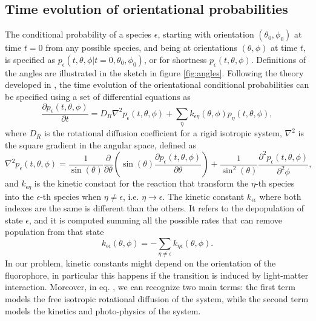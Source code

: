 \documentclass{article}
\begin{document}
\subsection{Time evolution of orientational probabilities}
The conditional probability of a species $\epsilon$, starting with orientation $(\theta_0, \phi_0)$ at time $t=0$ from any possible species, and being at orientations $(\theta, \phi)$ at time $t$, is specified as $p_\epsilon(t,\theta,\phi|t=0,\theta_0, \phi_0)$, or for shortness $p_\epsilon(t,\theta,\phi)$. Definitions of the angles are illustrated in the sketch in figure \ref{fig:angles}.
Following the theory developed in \cite{Fisz1996a, Fisz1996b}, the time evolution of the orientational conditional probabilities can be specified using a set of differential equations as
\begin{equation}\label{eq:time_propagation}
    \frac{\partial p_\epsilon(t,\theta,\phi)}{\partial t} =
    D_R \nabla^2 p_\epsilon(t,\theta,\phi)
    + \sum_\eta k_{\epsilon\eta} (\theta,\phi) p_\eta(t,\theta,\phi),
\end{equation}
where $D_R$ is the rotational diffusion coefficient for a rigid isotropic system, $\nabla^2$ is the square gradient in the angular space, defined as
\begin{equation}
    \nabla^2 p_\epsilon(t,\theta,\phi) =
    \frac{1}{\sin(\theta)} \frac{\partial}{\partial \theta} \left(
        \sin(\theta)
        \frac{\partial p_\epsilon(t,\theta,\phi) }{\partial \theta} \right)
    + \frac{1}{\sin^2(\theta)}
    \frac{\partial^2 p_\epsilon(t,\theta,\phi) }{\partial^2 \phi},
\end{equation}
and $k_{\epsilon\eta}$ is the kinetic constant for the reaction that transform the $\eta$-th species into the $\epsilon$-th species when $\eta \neq \epsilon$, i.e. $\eta \rightarrow \epsilon$. The kinetic constant $k_{\epsilon\epsilon}$ where both indexes are the same is different than the others. It refers to the depopulation of state $\epsilon$, and it is computed summing all the possible rates that can remove population from that state
\begin{equation}\label{eq:k_diagonal}
    k_{\epsilon\epsilon}(\theta,\phi) = 
    - \sum_{\eta \neq  \epsilon} k_{\eta\epsilon}(\theta,\phi).
\end{equation}
In our problem, kinetic constants might depend on the orientation of the fluorophore, in particular this happens if the transition is induced by light-matter interaction. Moreover, in eq. , we can recognize two main terms: the first term models the free isotropic rotational diffusion of the system, while the second term models the kinetics and photo-physics of the system.
\end{document}
